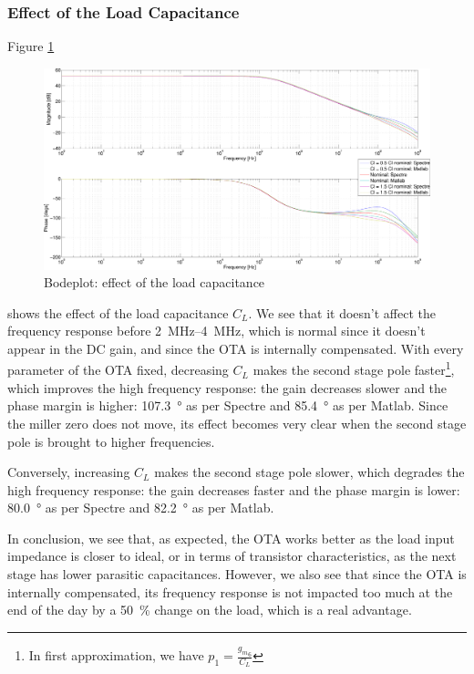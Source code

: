 \documentclass[english,10pt]{article}
\begin{document}
\subsubsection{Effect of the Load Capacitance}
Figure \ref{fig:cl}
\begin{figure}[htbp]
  \centering
  \includegraphics[width = \textwidth]{6_3.pdf}
  \caption{Bodeplot: effect of the load capacitance\label{fig:cl}}
\end{figure}
shows the effect of the load capacitance $C_L$. We see that it doesn't affect the frequency response before \SIrange{2}{4}{\mega\hertz}, which is normal since it doesn't appear in the DC gain, and since the OTA is internally compensated. With every parameter of the OTA fixed, decreasing $C_L$ makes the second stage pole faster\footnote{In first approximation, we have $p_1 = \frac{{g_m}_6}{C_L}$}, which improves the high frequency response: the gain decreases slower and the phase margin is higher: \SI{107.3}{\degree} as per Spectre and \SI{85.4}{\degree} as per Matlab. Since the miller zero does not move, its effect becomes very clear when the second stage pole is brought to higher frequencies.

Conversely, increasing $C_L$ makes the second stage pole slower, which degrades the high frequency response: the gain decreases faster and the phase margin is lower: \SI{80.0}{\degree} as per Spectre and \SI{82.2}{\degree} as per Matlab.

In conclusion, we see that, as expected, the OTA works better as the load input impedance is closer to ideal, or in terms of transistor characteristics, as the next stage has lower parasitic capacitances. However, we also see that since the OTA is internally compensated, its frequency response is not impacted too much at the end of the day by a \SI{50}{\percent} change on the load, which is a real advantage.
\end{document}
